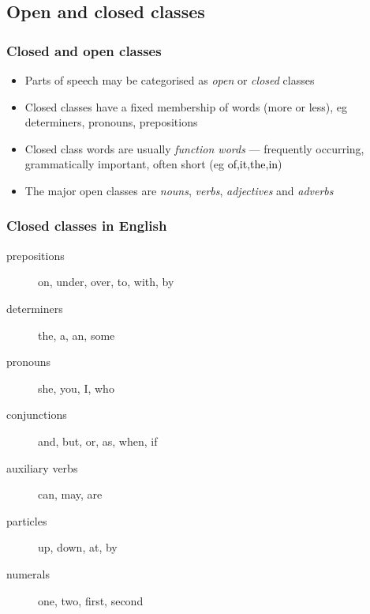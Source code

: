 \documentclass{beamer}
\begin{document}
\subsection{Open and closed classes}

\begin{frame}
  \frametitle{Closed and open classes}
  \begin{itemize}
  \item Parts of speech may be categorised as \emph{open} or
    \emph{closed} classes
  \item Closed classes have a fixed membership of words (more or
    less), eg determiners, pronouns, prepositions
  \item Closed class words are usually \emph{function words} ---
    frequently occurring, grammatically important, often short (eg
    \textcolor{black}{of,it,the,in})
  \item The major open classes are \emph{nouns}, \emph{verbs},
    \emph{adjectives} and \emph{adverbs}
  \end{itemize}
\end{frame}

\begin{frame}
  \frametitle{Closed classes in English}
  \begin{description}
  \item[prepositions] on, under, over, to, with, by
  \item[determiners] the, a, an, some
  \item[pronouns] she, you, I, who
  \item[conjunctions] and, but, or, as, when, if
  \item[auxiliary verbs] can, may, are
  \item[particles] up, down, at, by
  \item[numerals] one, two, first, second
  \end{description}
\end{frame}
\end{document}
